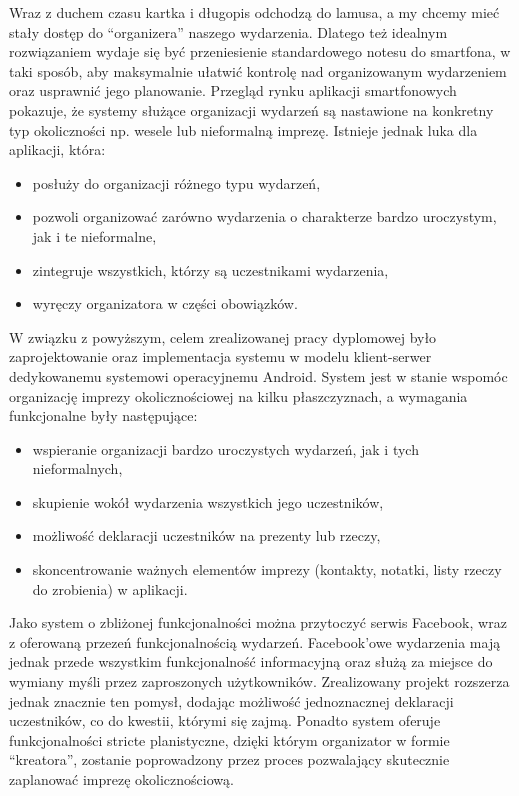 \documentclass[10pt,titlepage]{article}
\begin{document}
Wraz z duchem czasu kartka i długopis odchodzą do lamusa, a my chcemy mieć stały dostęp do ``organizera'' naszego wydarzenia. Dlatego też idealnym rozwiązaniem
wydaje się być przeniesienie standardowego notesu do smartfona, w taki sposób, aby maksymalnie ułatwić kontrolę nad organizowanym wydarzeniem oraz usprawnić jego planowanie.
Przegląd rynku aplikacji smartfonowych pokazuje, że systemy służące organizacji wydarzeń są nastawione na konkretny typ okoliczności np. wesele lub nieformalną imprezę.
Istnieje jednak luka dla aplikacji, która:

\begin{itemize}
 \item posłuży do organizacji różnego typu wydarzeń,
 \item pozwoli organizować zarówno wydarzenia o charakterze bardzo uroczystym, jak i te nieformalne,
 \item zintegruje wszystkich, którzy są uczestnikami wydarzenia,
 \item wyręczy organizatora w części obowiązków.
\end{itemize}


W związku z powyższym, celem zrealizowanej pracy dyplomowej było zaprojektowanie oraz implementacja systemu w modelu klient-serwer dedykowanemu systemowi operacyjnemu Android.
System jest w stanie wspomóc organizację imprezy okolicznościowej na kilku płaszczyznach, a wymagania funkcjonalne były następujące:

\begin{itemize}
 \item wspieranie organizacji bardzo uroczystych wydarzeń, jak i tych nieformalnych,
 \item skupienie wokół wydarzenia wszystkich jego uczestników,
 \item możliwość deklaracji uczestników na prezenty lub rzeczy,
 \item skoncentrowanie ważnych elementów imprezy (kontakty, notatki, listy rzeczy do zrobienia) w aplikacji.
\end{itemize}

Jako system o zbliżonej funkcjonalności można przytoczyć serwis Facebook, wraz z oferowaną przezeń funkcjonalnością wydarzeń.
Facebook'owe wydarzenia mają jednak przede wszystkim funkcjonalność informacyjną oraz służą za miejsce do wymiany myśli przez zaproszonych użytkowników.
Zrealizowany projekt rozszerza jednak znacznie ten pomysł, dodając możliwość jednoznacznej deklaracji uczestników, co do kwestii, którymi się zajmą.
Ponadto system oferuje funkcjonalności stricte planistyczne, dzięki którym organizator w formie ``kreatora'', zostanie poprowadzony przez proces pozwalający 
skutecznie zaplanować imprezę okolicznościową.
\end{document}
